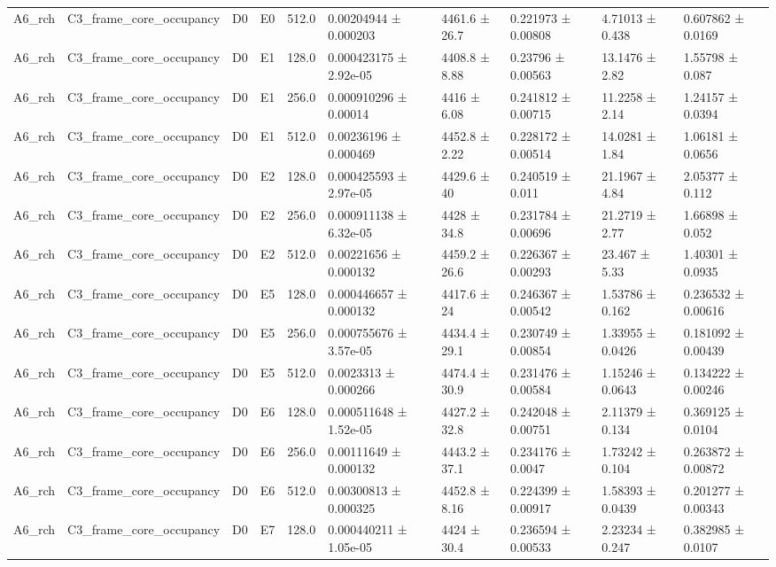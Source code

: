 \begin{table}
\begin{tabular}{llllllllll}
A6\_rch & C3\_frame\_core\_occupancy & D0 & E0 & 512.0 & 0.00204944 ± 0.000203 & 4461.6 ± 26.7 & 0.221973 ± 0.00808 & 4.71013 ± 0.438 & 0.607862 ± 0.0169 \\
A6\_rch & C3\_frame\_core\_occupancy & D0 & E1 & 128.0 & 0.000423175 ± 2.92e-05 & 4408.8 ± 8.88 & 0.23796 ± 0.00563 & 13.1476 ± 2.82 & 1.55798 ± 0.087 \\
A6\_rch & C3\_frame\_core\_occupancy & D0 & E1 & 256.0 & 0.000910296 ± 0.00014 & 4416 ± 6.08 & 0.241812 ± 0.00715 & 11.2258 ± 2.14 & 1.24157 ± 0.0394 \\
A6\_rch & C3\_frame\_core\_occupancy & D0 & E1 & 512.0 & 0.00236196 ± 0.000469 & 4452.8 ± 2.22 & 0.228172 ± 0.00514 & 14.0281 ± 1.84 & 1.06181 ± 0.0656 \\
A6\_rch & C3\_frame\_core\_occupancy & D0 & E2 & 128.0 & 0.000425593 ± 2.97e-05 & 4429.6 ± 40 & 0.240519 ± 0.011 & 21.1967 ± 4.84 & 2.05377 ± 0.112 \\
A6\_rch & C3\_frame\_core\_occupancy & D0 & E2 & 256.0 & 0.000911138 ± 6.32e-05 & 4428 ± 34.8 & 0.231784 ± 0.00696 & 21.2719 ± 2.77 & 1.66898 ± 0.052 \\
A6\_rch & C3\_frame\_core\_occupancy & D0 & E2 & 512.0 & 0.00221656 ± 0.000132 & 4459.2 ± 26.6 & 0.226367 ± 0.00293 & 23.467 ± 5.33 & 1.40301 ± 0.0935 \\
A6\_rch & C3\_frame\_core\_occupancy & D0 & E5 & 128.0 & 0.000446657 ± 0.000132 & 4417.6 ± 24 & 0.246367 ± 0.00542 & 1.53786 ± 0.162 & 0.236532 ± 0.00616 \\
A6\_rch & C3\_frame\_core\_occupancy & D0 & E5 & 256.0 & 0.000755676 ± 3.57e-05 & 4434.4 ± 29.1 & 0.230749 ± 0.00854 & 1.33955 ± 0.0426 & 0.181092 ± 0.00439 \\
A6\_rch & C3\_frame\_core\_occupancy & D0 & E5 & 512.0 & 0.0023313 ± 0.000266 & 4474.4 ± 30.9 & 0.231476 ± 0.00584 & 1.15246 ± 0.0643 & 0.134222 ± 0.00246 \\
A6\_rch & C3\_frame\_core\_occupancy & D0 & E6 & 128.0 & 0.000511648 ± 1.52e-05 & 4427.2 ± 32.8 & 0.242048 ± 0.00751 & 2.11379 ± 0.134 & 0.369125 ± 0.0104 \\
A6\_rch & C3\_frame\_core\_occupancy & D0 & E6 & 256.0 & 0.00111649 ± 0.000132 & 4443.2 ± 37.1 & 0.234176 ± 0.0047 & 1.73242 ± 0.104 & 0.263872 ± 0.00872 \\
A6\_rch & C3\_frame\_core\_occupancy & D0 & E6 & 512.0 & 0.00300813 ± 0.000325 & 4452.8 ± 8.16 & 0.224399 ± 0.00917 & 1.58393 ± 0.0439 & 0.201277 ± 0.00343 \\
A6\_rch & C3\_frame\_core\_occupancy & D0 & E7 & 128.0 & 0.000440211 ± 1.05e-05 & 4424 ± 30.4 & 0.236594 ± 0.00533 & 2.23234 ± 0.247 & 0.382985 ± 0.0107 \\

\end{tabular}
\end{table}
